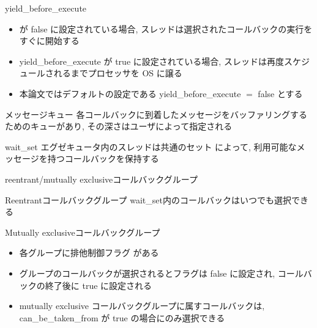 \begin{frame}{yield\_before\_execute}
    \begin{itemize}
        \item {} が false に設定されている場合, スレッドは選択されたコールバックの実行をすぐに開始する
        \item yield\_before\_execute が true に設定されている場合, スレッドは再度スケジュールされるまでプロセッサを OS に譲る
        \item 本論文ではデフォルトの設定である yield\_before\_execute $=$ false とする
    \end{itemize}
\end{frame}

\begin{frame}{メッセージキュー}
    各コールバックに到着したメッセージをバッファリングするためのキューがあり, その深さはユーザによって指定される
\end{frame}

\begin{frame}{wait\_set}
    エグゼキュータ内のスレッドは共通のセット  によって, 利用可能なメッセージを持つコールバックを保持する
\end{frame}

\begin{frame}{reentrant/mutually exclusiveコールバックグループ}
    \begin{block}{Reentrantコールバックグループ}
        wait\_set内のコールバックはいつでも選択できる
    \end{block}
    \begin{block}{Mutually exclusiveコールバックグループ}
        \setlength{\linewidth}{0.98\columnwidth}
        \begin{itemize}
            \item 各グループに排他制御フラグ  がある
            \item グループのコールバックが選択されるとフラグは false に設定され, コールバックの終了後に true に設定される
            \item mutually exclusive コールバックグループに属すコールバックは,  can\_be\_taken\_from が true の場合にのみ選択できる
        \end{itemize}
    \end{block}
\end{frame}

